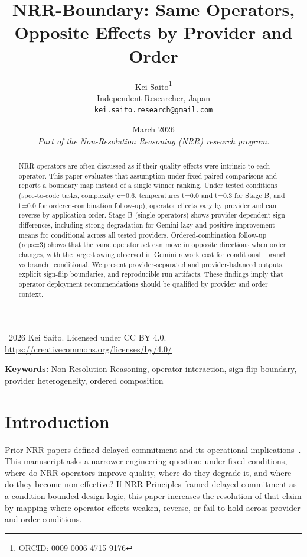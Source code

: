 \documentclass[11pt,a4paper]{article}
\title{\textbf{NRR-Boundary: Same Operators, Opposite Effects by Provider and Order}}
\author{
  Kei Saito\thanks{ORCID: 0009-0006-4715-9176} \\
  Independent Researcher, Japan \\
  \texttt{kei.saito.research@gmail.com}
}
\date{March 2026 \\[0.5em]
\textit{Part of the Non-Resolution Reasoning (NRR) research program.}}
\begin{document}
\maketitle

\begin{center}
\textcopyright\ 2026 Kei Saito.
Licensed under CC BY 4.0.\\
\url{https://creativecommons.org/licenses/by/4.0/}
\end{center}

\begin{abstract}
NRR operators are often discussed as if their quality effects were intrinsic to each operator. This paper evaluates that assumption under fixed paired comparisons and reports a boundary map instead of a single winner ranking. Under tested conditions (spec-to-code tasks, complexity c=0.6, temperatures t=0.0 and t=0.3 for Stage B, and t=0.0 for ordered-combination follow-up), operator effects vary by provider and can reverse by application order. Stage B (single operators) shows provider-dependent sign differences, including strong degradation for Gemini-lazy and positive improvement means for conditional across all tested providers. Ordered-combination follow-up (reps=3) shows that the same operator set can move in opposite directions when order changes, with the largest swing observed in Gemini rework cost for conditional\_branch vs branch\_conditional. We present provider-separated and provider-balanced outputs, explicit sign-flip boundaries, and reproducible run artifacts. These findings imply that operator deployment recommendations should be qualified by provider and order context.
\end{abstract}

\noindent\textbf{Keywords:} Non-Resolution Reasoning, operator interaction, sign flip boundary, provider heterogeneity, ordered composition

\section{Introduction}
\label{sec:intro}

Prior NRR papers defined delayed commitment and its operational implications~\cite{saito2025nrr,saito2026phi,saito2026ime}. This manuscript asks a narrower engineering question: under fixed conditions, where do NRR operators improve quality, where do they degrade it, and where do they become non-effective?
If NRR-Principles framed delayed commitment as a condition-bounded design logic, this paper increases the resolution of that claim by mapping where operator effects weaken, reverse, or fail to hold across provider and order conditions.
\end{document}
